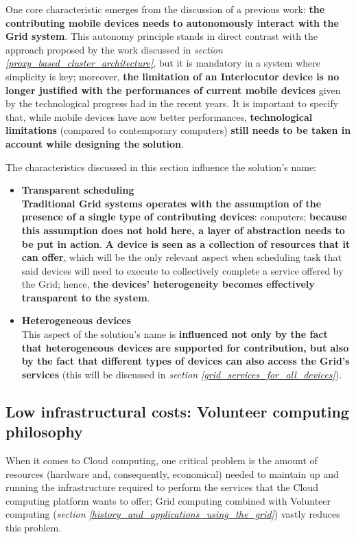 One core characteristic emerges from the discussion of a previous work: \textbf{the contributing mobile devices needs to autonomously interact with the Grid system}.
This autonomy principle stands in direct contrast with the approach proposed by the work discussed in \textit{section \ref{proxy_based_cluster_architecture}}, but it is mandatory in a system where simplicity is key; moreover, \textbf{the limitation of an Interlocutor device is no longer justified with the performances of current mobile devices} given by the technological progress had in the recent years. It is important to specify that, while mobile devices have now better performances, \textbf{technological limitations} (compared to contemporary computers) \textbf{still needs to be taken in account while designing the solution}.

The characteristics discussed in this section influence the solution's name:
\begin{itemize}
    \item \textbf{Transparent scheduling}\\
    \textbf{Traditional Grid systems operates with the assumption of the presence of a single type of contributing devices}: computers; \textbf{because this assumption does not hold here, a layer of abstraction needs to be put in action}. \textbf{A device is seen as a collection of resources that it can offer}, which will be the only relevant aspect when scheduling task that said devices will need to execute to collectively complete a service offered by the Grid; hence, \textbf{the devices' heterogeneity becomes effectively transparent to the system}.
    \item \textbf{Heterogeneous devices}\\
    This aspect of the solution's name is \textbf{influenced not only by the fact that heterogeneous devices are supported for contribution, but also by the fact that different types of devices can also access the Grid's services} (this will be discussed in \textit{section \ref{grid_services_for_all_devices}}).
\end{itemize}

\subsection{Low infrastructural costs: Volunteer computing philosophy}\label{low_infrastructural_costs_volunteer_computing_philosophy}
When it comes to Cloud computing, one critical problem is the amount of resources (hardware and, consequently, economical) needed to maintain up and running the infrastructure required to perform the services that the Cloud computing platform wants to offer; Grid computing combined with Volunteer computing (\textit{section \ref{history_and_applications_using_the_grid}}) vastly reduces this problem.

